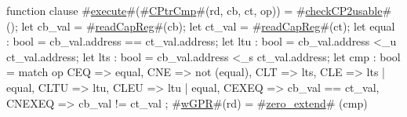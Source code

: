 function clause #\hyperref[zexecute]{execute}#(#\hyperref[zCPtrCmp]{CPtrCmp}#(rd, cb, ct, op)) = 
{
  #\hyperref[zcheckCP2usable]{checkCP2usable}#();
  let cb_val = #\hyperref[zreadCapReg]{readCapReg}#(cb);
  let ct_val = #\hyperref[zreadCapReg]{readCapReg}#(ct);
  let equal : bool = cb_val.address == ct_val.address;
  let ltu : bool = cb_val.address <_u ct_val.address;
  let lts : bool = cb_val.address <_s ct_val.address;
  let cmp : bool = match op {
    CEQ    => equal,
    CNE    => not (equal),
    CLT    => lts,
    CLE    => lts | equal,
    CLTU   => ltu,
    CLEU   => ltu | equal,
    CEXEQ  => cb_val == ct_val,
    CNEXEQ => cb_val != ct_val
  };
  #\hyperref[zwGPR]{wGPR}#(rd) = #\hyperref[zzzerozyextend]{zero\_extend}# (cmp)
}
